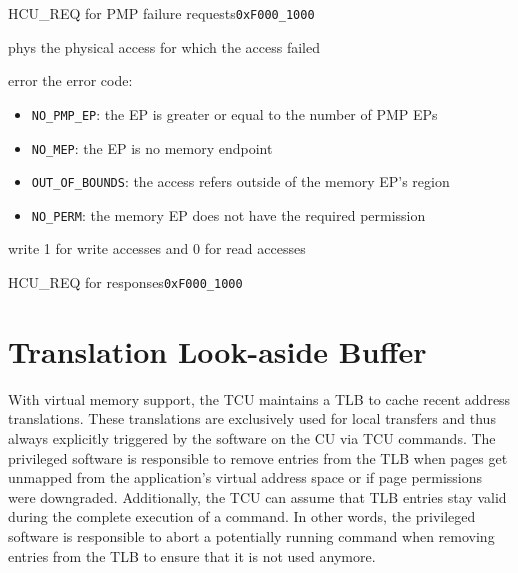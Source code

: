 \begin{register}{H}{CU\_REQ for PMP failure requests}{\texttt{0xF000\_1000}}
  \regnewline%
  \begin{regdesc}\begin{reglist}
    \item[phys] the physical access for which the access failed
    \item[error] the error code:
    \begin{itemize}
       \item \texttt{NO\_PMP\_EP}: the EP is greater or equal to the number of PMP EPs
       \item \texttt{NO\_MEP}: the EP is no memory endpoint
       \item \texttt{OUT\_OF\_BOUNDS}: the access refers outside of the memory EP's region
       \item \texttt{NO\_PERM}: the memory EP does not have the required permission
     \end{itemize}
    \item[write] 1 for write accesses and 0 for read accesses
  \end{reglist}\end{regdesc}
\end{register}

\begin{register}{H}{CU\_REQ for responses}{\texttt{0xF000\_1000}}
  \regnewline%
\end{register}
\extend{}

\section{Translation Look-aside Buffer}
\label{sec:tlb}

With virtual memory support, the TCU maintains a TLB to cache recent address translations. These
translations are exclusively used for local transfers and thus always explicitly triggered by the
software on the CU via TCU commands. The privileged software is responsible to remove entries from
the TLB when pages get unmapped from the application's virtual address space or if page permissions
were downgraded. Additionally, the TCU can assume that TLB entries stay valid during the complete
execution of a command. In other words, the privileged software is responsible to abort a
potentially running command when removing entries from the TLB to ensure that it is not used
anymore.

